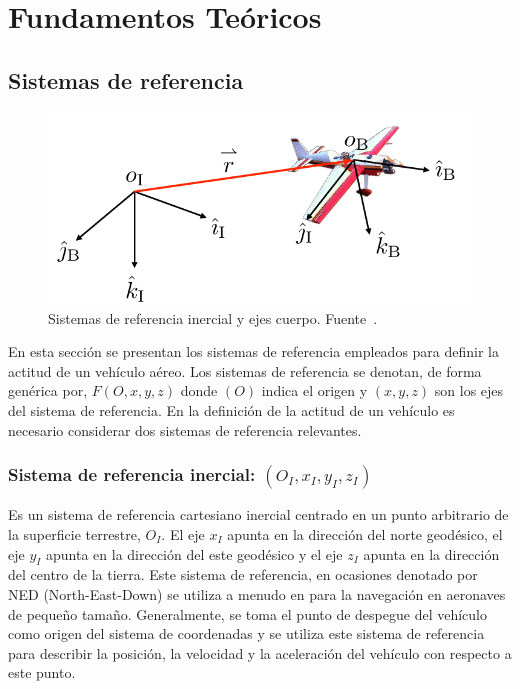 \documentclass[a4paper,12pt]{book}
\begin{document}
\chapter{Fundamentos Teóricos}\label{chapter:fundamentos}


\section{Sistemas de referencia}

\begin{figure}[!ht]
    \centering
	\includegraphics[width=0.7\linewidth]{Figures/frames.png}
 	\caption{Sistemas de referencia inercial y ejes cuerpo. Fuente~\cite{mullen2016filtered}.}
 	\label{fig:frames}
\end{figure}
En esta sección se presentan los sistemas de referencia empleados para definir la actitud de un vehículo aéreo. Los sistemas de referencia se denotan, de forma genérica por, $F(O,x,y,z)$ donde $(O)$ indica el origen y $(x,y,z)$ son los ejes del sistema de referencia. En la definición de la actitud de un vehículo es necesario considerar dos sistemas de referencia relevantes.

\subsection{Sistema de referencia inercial: $(O_I, x_I, y_I, z_I)$}

Es un sistema de referencia cartesiano inercial centrado en un punto arbitrario de la superficie terrestre, $O_I$. El eje $x_I$ apunta en la dirección del norte geodésico, el eje $y_I$ apunta en la dirección del este geodésico y el eje $z_I$ apunta en la dirección del centro de la tierra. Este sistema de referencia, en ocasiones denotado por NED (North-East-Down) se utiliza a menudo en para la navegación en aeronaves de pequeño tamaño. Generalmente, se toma el punto de despegue del vehículo como origen del sistema de coordenadas y se utiliza este sistema de referencia para describir la posición, la velocidad y la aceleración del vehículo con respecto a este punto.
\end{document}

